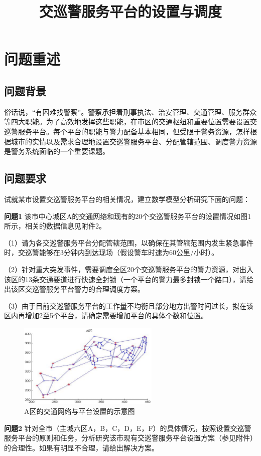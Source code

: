 \documentclass[withoutpreface,bwprint]{cumcmthesis} %
\title{交巡警服务平台的设置与调度}
\begin{document}
	
	\maketitle
	\begin{abstract}
		
		
	\end{abstract}
	
	\tableofcontents
	
	\newpage
	
	\section{问题重述}
	\subsection{问题背景}
	俗话说，“有困难找警察”。警察承担着刑事执法、治安管理、交通管理、服务群众等四大职能。为了高效地发挥这些职能，在市区的交通枢纽和重要位置需要设置交巡警服务平台。每个平台的职能与警力配备基本相同，但受限于警务资源，怎样根据城市的实情以及需求合理地设置交巡警服务平台、分配管辖范围、调度警力资源是警务系统面临的一个重要课题。
	
	\subsection{问题要求}
	
	试就某市设置交巡警服务平台的相关情况，建立数学模型分析研究下面的问题：
	
	\textbf{问题1}  
	该市中心城区A的交通网络和现有的20个交巡警服务平台的设置情况如图1所示，相关的数据信息见附件2。
	
	（1）请为各交巡警服务平台分配管辖范围，以确保在其管辖范围内发生紧急事件时，交巡警能够在3分钟内到达现场（假设警车时速为60公里/小时）。
	
	（2）针对重大突发事件，需要调度全区20个交巡警服务平台的警力资源，对出入该区的13条交通要道进行快速全封锁（一个平台的警力最多封锁一个路口），请给出该区交巡警服务平台警力的合理调度方案。
	
	（3）由于目前交巡警服务平台的工作量不均衡且部分地方出警时间过长，拟在该区内再增加2至5个平台，请确定需要增加平台的具体个数和位置。
	
	\begin{figure}[H]
		\centering
		\includegraphics[width=0.6\textwidth]{A区的交通网络与平台设置的示意图.png}
		\caption{A区的交通网络与平台设置的示意图}\label{A区交通网络示意图}
	\end{figure}
	\textbf{问题2}  针对全市（主城六区A，B，C，D，E，F）的具体情况，按照设置交巡警服务平台的原则和任务，分析研究该市现有交巡警服务平台设置方案（参见附件）的合理性。如果有明显不合理，请给出解决方案。
	
\end{document}
